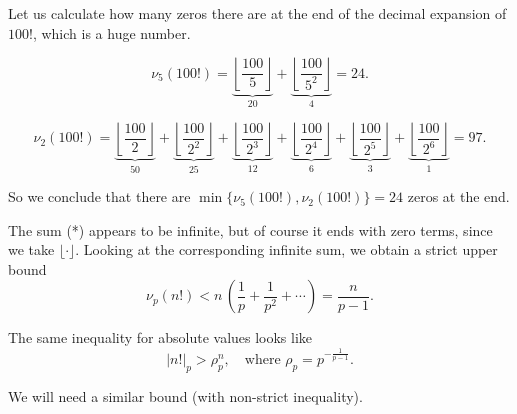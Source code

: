 \documentclass{article}
\newcommand{\examplesymbol}{$\blacktriangle$}
\renewcommand{\qedsymbol}{$\blacksquare$}
\theoremstyle{myplain}
\theoremstyle{mydefinition}
\newenvironment{example}
  {\pushQED{\qed}\renewcommand{\qedsymbol}{\examplesymbol}\examplex}
  {\popQED\endexamplex}
\begin{document}
\begin{example}
  Let us calculate how many zeros there are at the end of the decimal expansion
  of $100!$, which is a huge number.

  \[ \nu_5 (100!) =
    \underbrace{\left\lfloor\frac{100}{5}\right\rfloor}_{20} +
    \underbrace{\left\lfloor\frac{100}{5^2}\right\rfloor}_4 = 24. \]

  \[ \nu_2 (100!) =
    \underbrace{\left\lfloor\frac{100}{2}\right\rfloor}_{50} +
    \underbrace{\left\lfloor\frac{100}{2^2}\right\rfloor}_{25} +
    \underbrace{\left\lfloor\frac{100}{2^3}\right\rfloor}_{12} +
    \underbrace{\left\lfloor\frac{100}{2^4}\right\rfloor}_6 +
    \underbrace{\left\lfloor\frac{100}{2^5}\right\rfloor}_3 +
    \underbrace{\left\lfloor\frac{100}{2^6}\right\rfloor}_1 = 97. \]

  So we conclude that there are $\min \{ \nu_5 (100!), \nu_2 (100!) \} = 24$
  zeros at the end.
\end{example}

The sum (*) appears to be infinite, but of course it ends with zero terms, since
we take $\lfloor\cdot\rfloor$. Looking at the corresponding infinite sum, we
obtain a strict upper bound
$$\nu_p (n!) < n \, \left(\frac{1}{p} + \frac{1}{p^2} + \cdots\right) = \frac{n}{p-1}.$$

The same inequality for absolute values looks like
$$|n!|_p > \rho_p^n, \quad \text{where } \rho_p = p^{-\frac{1}{p-1}}.$$

We will need a similar bound (with non-strict inequality).
\end{document}
